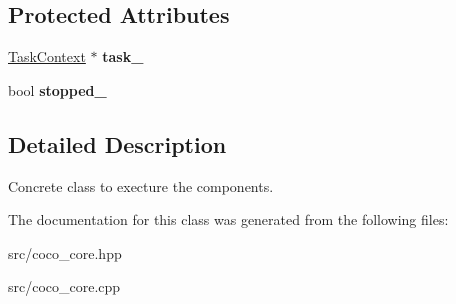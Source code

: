 \subsection*{Protected Attributes}
\begin{DoxyCompactItemize}
\item 
\hypertarget{classcoco_1_1_execution_engine_ae0729158d86ae748445f521baea61d7a}{}\hyperlink{classcoco_1_1_task_context}{Task\+Context} $\ast$ {\bfseries task\+\_\+}\label{classcoco_1_1_execution_engine_ae0729158d86ae748445f521baea61d7a}

\item 
\hypertarget{classcoco_1_1_execution_engine_a5a3c72d66f0395812ca730c826690a66}{}bool {\bfseries stopped\+\_\+}\label{classcoco_1_1_execution_engine_a5a3c72d66f0395812ca730c826690a66}

\end{DoxyCompactItemize}


\subsection{Detailed Description}
Concrete class to execture the components. 

The documentation for this class was generated from the following files\+:\begin{DoxyCompactItemize}
\item 
src/coco\+\_\+core.\+hpp\item 
src/coco\+\_\+core.\+cpp\end{DoxyCompactItemize}
